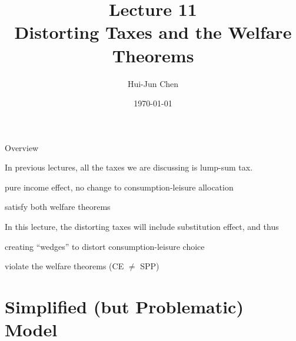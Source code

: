 \documentclass[11pt,aspectratio=169,usenames,dvipsnames]{beamer}
\title[Lecture 9]{Lecture 11 \\ Distorting Taxes and the Welfare Theorems}
\author[Hui-Jun Chen]{Hui-Jun Chen}
\institute[NTHU]{National Tsing Hua University}
\date{\today}
\let\tempone\itemize
\let\temptwo\enditemize
\renewenvironment{itemize}{\tempone\addtolength{\itemsep}{\fill}}{\temptwo}
\begin{document}
\begin{frame}[plain]
    \titlepage
\end{frame}


\begin{frame}{Overview}
\label{slide:Overview}

In previous lectures, all the taxes we are discussing is \alert{lump-sum tax}.

\begin{itemize}
    \item pure \alert{income effect}, no change to consumption-leisure allocation
    \item satisfy both welfare theorems
\end{itemize}

In this lecture, the \alert{distorting taxes} will include \alert{substitution effect}, and thus

\begin{itemize}
    \item creating ``wedges'' to distort consumption-leisure choice
    \item violate the welfare theorems (CE $ \neq $ SPP)
\end{itemize}

\end{frame}

\section{Simplified (but Problematic) Model}
\label{sec:Simplified_Model}
\end{document}

